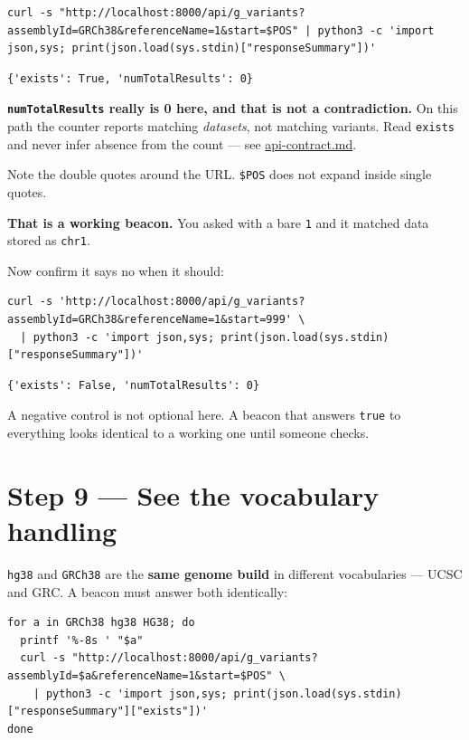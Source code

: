 \documentclass[
  10pt,
]{article}
\begin{document}
\begin{verbatim}
curl -s "http://localhost:8000/api/g_variants?assemblyId=GRCh38&referenceName=1&start=$POS" | python3 -c 'import json,sys; print(json.load(sys.stdin)["responseSummary"])'
\end{verbatim}

\begin{verbatim}
{'exists': True, 'numTotalResults': 0}
\end{verbatim}

\textbf{\texttt{numTotalResults} really is 0 here, and that is not a
contradiction.} On this path the counter reports matching
\emph{datasets}, not matching variants. Read \texttt{exists} and never
infer absence from the count --- see \url{api-contract.md}.

Note the double quotes around the URL. \texttt{\$POS} does not expand
inside single quotes.

\textbf{That is a working beacon.} You asked with a bare \texttt{1} and
it matched data stored as \texttt{chr1}.

Now confirm it says no when it should:

\begin{verbatim}
curl -s 'http://localhost:8000/api/g_variants?assemblyId=GRCh38&referenceName=1&start=999' \
  | python3 -c 'import json,sys; print(json.load(sys.stdin)["responseSummary"])'
\end{verbatim}

\begin{verbatim}
{'exists': False, 'numTotalResults': 0}
\end{verbatim}

A negative control is not optional here. A beacon that answers
\texttt{true} to everything looks identical to a working one until
someone checks.

\section{Step 9 --- See the vocabulary
handling}\label{step-9-see-the-vocabulary-handling}

\texttt{hg38} and \texttt{GRCh38} are the \textbf{same genome build} in
different vocabularies --- UCSC and GRC. A beacon must answer both
identically:

\begin{verbatim}
for a in GRCh38 hg38 HG38; do
  printf '%-8s ' "$a"
  curl -s "http://localhost:8000/api/g_variants?assemblyId=$a&referenceName=1&start=$POS" \
    | python3 -c 'import json,sys; print(json.load(sys.stdin)["responseSummary"]["exists"])'
done
\end{verbatim}
\end{document}
